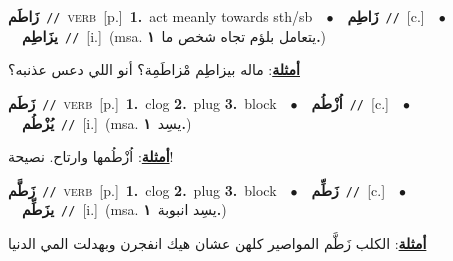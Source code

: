 \documentclass[10pt,a4paper,twoside]{article} %
\begin{document}
\begin{multicols}{2}
{\setlength\topsep{0pt}\textbf{\foreignlanguage{arabic}{زَاطَم}}\ {\color{gray}\texttt{//}\color{black}}\ \textsc{verb}\ [p.]\ \textbf{1.}~act meanly towards sth/sb\ \ $\bullet$\ \ \setlength\topsep{0pt}\textbf{\foreignlanguage{arabic}{زَاطِم}}\ {\color{gray}\texttt{//}\color{black}}\ [c.]\ \ $\bullet$\ \ \setlength\topsep{0pt}\textbf{\foreignlanguage{arabic}{يزَاطِم}}\ {\color{gray}\texttt{//}\color{black}}\ [i.]\ \color{gray}(msa. \foreignlanguage{arabic}{يتعامل بلؤم تجاه شخص ما}~\foreignlanguage{arabic}{\textbf{١.}})\color{black}\  \begin{flushright}\color{gray}\foreignlanguage{arabic}{\textbf{\underline{\foreignlanguage{arabic}{أمثلة}}}: ماله بيزاطِم مْزاطَمِة؟ أنو اللي دعس عذنبه؟}\end{flushright}\color{black}} \vspace{2mm}

{\setlength\topsep{0pt}\textbf{\foreignlanguage{arabic}{زَطَم}}\ {\color{gray}\texttt{//}\color{black}}\ \textsc{verb}\ [p.]\ \textbf{1.}~clog  \textbf{2.}~plug  \textbf{3.}~block\ \ $\bullet$\ \ \setlength\topsep{0pt}\textbf{\foreignlanguage{arabic}{اُزْطُم}}\ {\color{gray}\texttt{//}\color{black}}\ [c.]\ \ $\bullet$\ \ \setlength\topsep{0pt}\textbf{\foreignlanguage{arabic}{يُزْطُم}}\ {\color{gray}\texttt{//}\color{black}}\ [i.]\ \color{gray}(msa. \foreignlanguage{arabic}{يسِد}~\foreignlanguage{arabic}{\textbf{١.}})\color{black}\  \begin{flushright}\color{gray}\foreignlanguage{arabic}{\textbf{\underline{\foreignlanguage{arabic}{أمثلة}}}: اُزْطُمها وارتاح. نصيحة!}\end{flushright}\color{black}} \vspace{2mm}

{\setlength\topsep{0pt}\textbf{\foreignlanguage{arabic}{زَطَّم}}\ {\color{gray}\texttt{//}\color{black}}\ \textsc{verb}\ [p.]\ \textbf{1.}~clog  \textbf{2.}~plug  \textbf{3.}~block\ \ $\bullet$\ \ \setlength\topsep{0pt}\textbf{\foreignlanguage{arabic}{زَطِّم}}\ {\color{gray}\texttt{//}\color{black}}\ [c.]\ \ $\bullet$\ \ \setlength\topsep{0pt}\textbf{\foreignlanguage{arabic}{يزَطِّم}}\ {\color{gray}\texttt{//}\color{black}}\ [i.]\ \color{gray}(msa. \foreignlanguage{arabic}{يسِد انبوبة}~\foreignlanguage{arabic}{\textbf{١.}})\color{black}\  \begin{flushright}\color{gray}\foreignlanguage{arabic}{\textbf{\underline{\foreignlanguage{arabic}{أمثلة}}}: الكلب زَطَّم المواصير كلهن عشان هيك انفجرن وبهدلت المي الدنيا}\end{flushright}\color{black}} \vspace{2mm}


\end{multicols}
\end{document}
